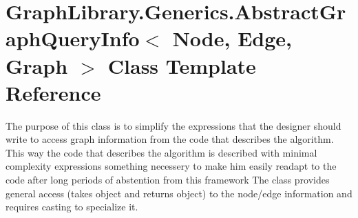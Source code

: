 \hypertarget{class_graph_library_1_1_generics_1_1_abstract_graph_query_info}{}\section{Graph\+Library.\+Generics.\+Abstract\+Graph\+Query\+Info$<$ Node, Edge, Graph $>$ Class Template Reference}
\label{class_graph_library_1_1_generics_1_1_abstract_graph_query_info}


The purpose of this class is to simplify the expressions that the designer should write to access graph information from the code that describes the algorithm. This way the code that describes the algorithm is described with minimal complexity expressions something necessery to make him easily readapt to the code after long periods of abstention from this framework The class provides general access (takes object and returns object) to the node/edge information and requires casting to specialize it.  


